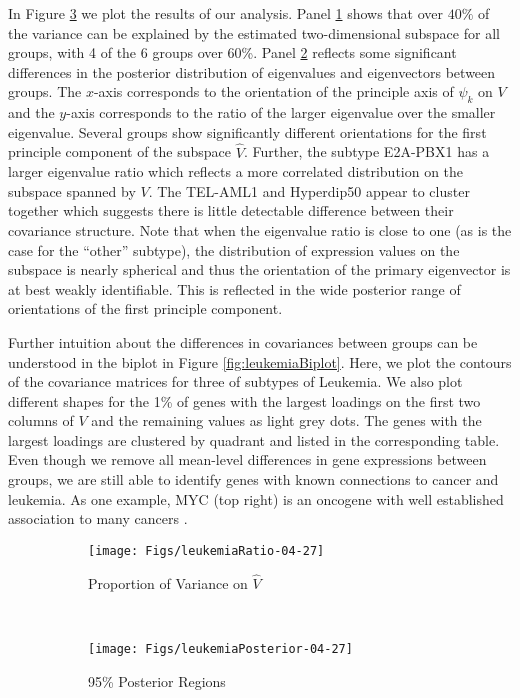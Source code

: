 \documentclass{article}
\begin{document}
In Figure \ref{fig:leukemia} we plot the results of our analysis.
Panel \ref{fig:leukemiaRatio} shows that over $40\%$ of the variance
can be explained by the estimated two-dimensional subspace for all groups, with 4 of
the 6 groups over 60\%.  Panel \ref{fig:leukemiaPosterior} reflects some significant
differences in the posterior distribution of eigenvalues and
eigenvectors between groups.  The $x$-axis corresponds to the
orientation of the principle axis of $\psi_k$ on $V$ and the $y$-axis
corresponds to the ratio of the larger eigenvalue over the smaller
eigenvalue.  Several groups show significantly different orientations
for the first principle component of the subspace $\hat{V}$.  Further,
the subtype E2A-PBX1 has a larger eigenvalue ratio which reflects a
more correlated distribution on the subspace spanned by $V$.  The
TEL-AML1 and Hyperdip50 appear to cluster together which suggests
there is little detectable difference between their covariance
structure.  Note that when the eigenvalue ratio is close to one (as is
the case for the ``other'' subtype), the distribution of expression
values on the subspace is nearly spherical and thus the orientation of
the primary eigenvector is at best weakly identifiable.  This is
reflected in the wide posterior range of orientations of the first
principle component.

Further intuition about the differences in covariances between groups
can be understood in the biplot in Figure \ref{fig:leukemiaBiplot}.
Here, we plot the contours of the covariance matrices for three of
subtypes of Leukemia.  We also plot different shapes for the 1\% of genes with
the largest loadings on the first two columns of $V$ and the
remaining values as light grey dots.  The genes with the largest
loadings are clustered by quadrant and listed in the corresponding
table.  Even though we remove all mean-level differences in gene
expressions between groups, we are still able to identify genes with
known connections to cancer and leukemia.  As one example, MYC (top
right) is an oncogene with well established association to many
cancers \citep{Dang2012}.

\begin{figure}[t]
    \centering
    \begin{subfigure}[b]{0.45\textwidth}
        \texttt{[image: Figs/leukemiaRatio-04-27]}
        \caption{Proportion of Variance on $\hat{V}$}
        \label{fig:leukemiaRatio}
    \end{subfigure}
    ~ %
    \begin{subfigure}[b]{0.45\textwidth}
        \texttt{[image: Figs/leukemiaPosterior-04-27]}
        \caption{95\% Posterior Regions }
        \label{fig:leukemiaPosterior}
    \end{subfigure}
\caption{}
\label{fig:leukemia}
\end{figure}
\end{document}
